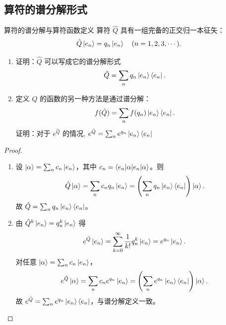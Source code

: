 \subsection{算符的谱分解形式}
\begin{problembox}{算符的谱分解与算符函数定义}
	算符 $\hat{Q}$ 具有一组完备的正交归一本征矢：
	\[
	\hat{Q} \ket{e_{n}} = q_{n} \ket{e_{n}} \quad (n=1,2,3,\cdots).
	\]
	
	\begin{enumerate}[label=(\arabic*), leftmargin=*]
		\item 证明：$\hat{Q}$ 可以写成它的谱分解形式
		\[
		\hat{Q} = \sum_{n} q_{n} \ket{e_{n}}\bra{e_{n}}.
		\]
		\item 定义 $\hat{Q}$ 的函数的另一种方法是通过谱分解：
		\[
		f(\hat{Q}) = \sum_{n} f(q_{n}) \ket{e_{n}}\bra{e_{n}}.
		\]
		证明：对于 $e^{\hat{Q}}$ 的情况, $e^{\hat{Q}} = \sum_{n} e^{q_{n}} \ket{e_{n}}\bra{e_{n}}$
	\end{enumerate}
\end{problembox}

\begin{proof}
	\begin{enumerate}[label=(\arabic*), leftmargin=*]
		\item 设 $\ket{\alpha} = \sum_{n} c_{n} \ket{e_{n}}$，其中 $c_{n} = \braket{e_{n}|\alpha}$。则
		\[
		\hat{Q} \ket{\alpha} = \sum_{n} c_{n} q_{n} \ket{e_{n}}
		= \left( \sum_{n} q_{n} \ket{e_{n}}\bra{e_{n}} \right) \ket{\alpha}.
		\]
		故 $\hat{Q} = \sum_{n} q_{n} \ket{e_{n}}\bra{e_{n}}$。
		\item 由 $\hat{Q}^{k} \ket{e_{n}} = q_{n}^{k} \ket{e_{n}}$ 得
		\[
		e^{\hat{Q}} \ket{e_{n}} = \sum_{k=0}^{\infty} \frac{1}{k!} q_{n}^{k} \ket{e_{n}}
		= e^{q_{n}} \ket{e_{n}}.
		\]
		对任意 $\ket{\alpha} = \sum_{n} c_{n} \ket{e_{n}}$，
		\[
		e^{\hat{Q}} \ket{\alpha} = \sum_{n} c_{n} e^{q_{n}} \ket{e_{n}}
		= \left( \sum_{n} e^{q_{n}} \ket{e_{n}}\bra{e_{n}} \right) \ket{\alpha}.
		\]
		故 $e^{\hat{Q}} = \sum_{n} e^{q_{n}} \ket{e_{n}}\bra{e_{n}}$，与谱分解定义一致。
	\end{enumerate}
\end{proof}